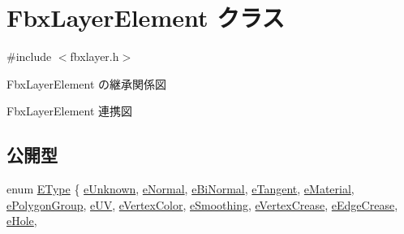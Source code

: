 \hypertarget{class_fbx_layer_element}{}\section{Fbx\+Layer\+Element クラス}
\label{class_fbx_layer_element}


{\ttfamily \#include $<$fbxlayer.\+h$>$}



Fbx\+Layer\+Element の継承関係図


Fbx\+Layer\+Element 連携図
\subsection*{公開型}
\begin{DoxyCompactItemize}
\item 
enum \hyperlink{class_fbx_layer_element_a8c95c5cd880b56c776acd379bd86f42c}{E\+Type} \{ \newline
\hyperlink{class_fbx_layer_element_a8c95c5cd880b56c776acd379bd86f42cab3768744dc14ef9fcf6631d3ade97e54}{e\+Unknown}, 
\hyperlink{class_fbx_layer_element_a8c95c5cd880b56c776acd379bd86f42cae9b273e2ecbd6c3d1443447d85787f14}{e\+Normal}, 
\hyperlink{class_fbx_layer_element_a8c95c5cd880b56c776acd379bd86f42ca1c6b8d970e3f0d3baabeeb9ccf3e7adf}{e\+Bi\+Normal}, 
\hyperlink{class_fbx_layer_element_a8c95c5cd880b56c776acd379bd86f42ca96bd14320ac3622b6a6c1b7904064244}{e\+Tangent}, 
\newline
\hyperlink{class_fbx_layer_element_a8c95c5cd880b56c776acd379bd86f42ca595126582083f962d49d342392bbb847}{e\+Material}, 
\hyperlink{class_fbx_layer_element_a8c95c5cd880b56c776acd379bd86f42cabad421535bc02ce35b95bc68019191ba}{e\+Polygon\+Group}, 
\hyperlink{class_fbx_layer_element_a8c95c5cd880b56c776acd379bd86f42ca8b70d2a9b7a39d7a2f9bf8ea5fe7967d}{e\+UV}, 
\hyperlink{class_fbx_layer_element_a8c95c5cd880b56c776acd379bd86f42ca61e561a079e40b3ff18a6c3666aa6395}{e\+Vertex\+Color}, 
\newline
\hyperlink{class_fbx_layer_element_a8c95c5cd880b56c776acd379bd86f42ca403e47b23cd7a0693610cc1fd21de60e}{e\+Smoothing}, 
\hyperlink{class_fbx_layer_element_a8c95c5cd880b56c776acd379bd86f42ca7b639bff1426d7f7e52bcc6de4c24463}{e\+Vertex\+Crease}, 
\hyperlink{class_fbx_layer_element_a8c95c5cd880b56c776acd379bd86f42ca28616ca98fdfd405d95c116bd7b7dd01}{e\+Edge\+Crease}, 
\hyperlink{class_fbx_layer_element_a8c95c5cd880b56c776acd379bd86f42cab38d7c677d06f709e5321d841afdc1b8}{e\+Hole}, 
\newline

\end{DoxyCompactItemize}
